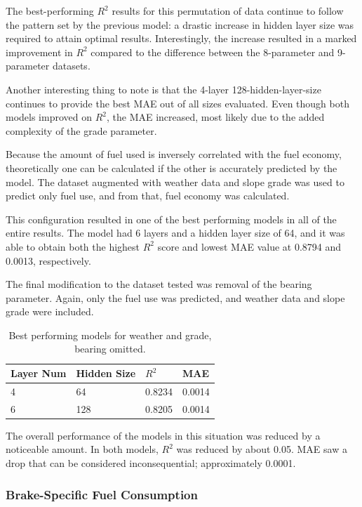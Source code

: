 \documentclass[letterpaper]{article}
\begin{document}
The best-performing $R^{2}$ results for this permutation of data continue 
to follow the pattern set by the previous model: a drastic increase in 
hidden layer size was required to attain optimal results. Interestingly, 
the increase resulted in a marked improvement in $R^{2}$ compared to the 
difference between the 8-parameter and 9-parameter datasets.

Another interesting thing to note is that the 4-layer 128-hidden-layer-size 
continues to provide the best MAE out of all sizes evaluated. Even though 
both models improved on $R^{2}$, the MAE increased, most likely due to the 
added complexity of the grade parameter.

Because the amount of fuel used is inversely correlated with the fuel 
economy, theoretically one can be calculated if the other is accurately 
predicted by the model. The dataset augmented with weather data and slope 
grade was used to predict only fuel use, and from that, fuel economy was 
calculated.

This configuration resulted in one of the best performing models in all of 
the entire results. The model had 6 layers and a hidden layer size of 64, 
and it was able to obtain both the highest $R^{2}$ score and lowest MAE 
value at 0.8794 and 0.0013, respectively.

The final modification to the dataset tested was removal of the bearing 
parameter. Again, only the fuel use was predicted, and weather data and 
slope grade were included.

\begin{table}[]
\begin{tabular}{|l|l|l|l|}
    \hline
    \textbf{Layer Num} & \textbf{Hidden Size} & \textbf{$R^{2}$} & \textbf{MAE} \\
    \hline
    4              	& 64               	& 0.8234  	& 0.0014   	\\
    6              	& 128              	& 0.8205  	& 0.0014 	\\
    \hline
\end{tabular}
\caption{Best performing models for weather and grade, bearing omitted.}
\label{tab:tb4}
\end{table}

The overall performance of the models in this situation was reduced by a 
noticeable amount. In both models, $R^{2}$ was reduced by about 0.05. MAE 
saw a drop that can be considered inconsequential; approximately 0.0001.

\subsubsection*{Brake-Specific Fuel Consumption}
\end{document}
